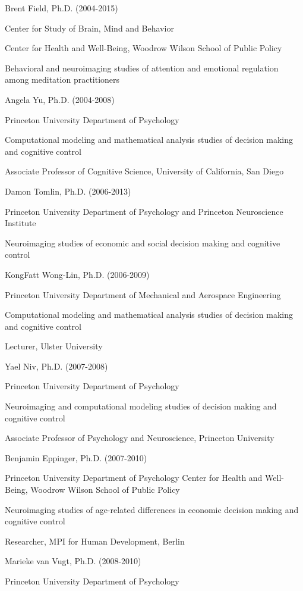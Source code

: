 \documentclass[10 pt]{article}
\begin{document}
Brent Field, Ph.D. (2004-2015)

Center for Study of Brain, Mind and Behavior

Center for Health and Well-Being, Woodrow Wilson School of Public Policy

Behavioral and neuroimaging studies of attention and emotional regulation among meditation practitioners
    \medskip

Angela Yu, Ph.D. (2004-2008)

Princeton University Department of Psychology

Computational modeling and mathematical analysis studies of decision making and cognitive control

Associate Professor of Cognitive Science, University of California, San Diego
    \medskip

Damon Tomlin, Ph.D. (2006-2013)

Princeton University Department of Psychology and Princeton Neuroscience Institute

Neuroimaging studies of economic and social decision making and cognitive control
    \medskip

KongFatt Wong-Lin, Ph.D. (2006-2009)

Princeton University Department of Mechanical and Aerospace Engineering

Computational modeling and mathematical analysis studies of decision making and cognitive control

Lecturer, Ulster University
    \medskip

Yael Niv, Ph.D. (2007-2008)

Princeton University Department of Psychology

Neuroimaging and computational modeling studies of decision making and cognitive control

Associate Professor of Psychology and Neuroscience, Princeton University
    \medskip

Benjamin Eppinger, Ph.D. (2007-2010)

Princeton University Department of Psychology
Center for Health and Well-Being, Woodrow Wilson School of Public Policy

Neuroimaging studies of age-related differences in economic decision making and cognitive control

Researcher, MPI for Human Development, Berlin
    \medskip

Marieke van Vugt, Ph.D. (2008-2010)

Princeton University Department of Psychology
\end{document}
